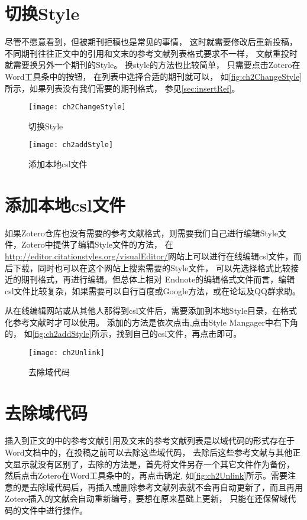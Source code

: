 \documentclass[cn,11pt,chinese]{elegantbook}
\begin{document}
		\section{切换Style}\label{sec:changeStyle}
			尽管不愿意看到，但被期刊拒稿也是常见的事情，
			这时就需要修改后重新投稿，不同期刊往往正文中的引用和文末的参考文献列表格式要求不一样，
			文献重投时就需要换另外一个期刊的Style。
			换style的方法也比较简单，
			只需要点击Zotero在Word工具条中的按钮，
			在列表中选择合适的期刊就可以，
			如\autoref{fig:ch2ChangeStyle}所示，如果列表没有我们需要的期刊格式，
			参见\cref{sec:insertRef}。
				\begin{figure}
					\centering
					\texttt{[image: ch2ChangeStyle]}
					\caption{切换Style}
					\label{fig:ch2ChangeStyle}
				\end{figure}
				\begin{figure}[htbp]
					\centering
					\texttt{[image: ch2addStyle]}
					\caption{添加本地csl文件}
					\label{fig:ch2addStyle}
				\end{figure}
		\section{添加本地csl文件}\label{sec:addStyle}
				如果Zotero仓库也没有需要的参考文献格式，则需要我们自己进行编辑Style文件，Zotero中提供了编辑Style文件的方法，
				在\url{http://editor.citationstyles.org/visualEditor/}网站上可以进行在线编辑csl文件，而后下载，同时也可以在这个网站上搜索需要的Style文件，
				可以先选择格式比较接近的期刊格式，再进行编辑。但总体上相对 Endnote的编辑格式文件而言，编辑csl文件比较复杂，如果需要可以自行百度或Google方法，或在论坛及QQ群求助。
			
				从在线编辑网站或从其他人那得到csl文件后，需要添加到本地Style目录，在格式化参考文献时才可以使用。
				添加的方法是依次点击,点击Style Mangager中右下角的\menu{+}，
				如\autoref{fig:ch2addStyle}所示，找到自己的csl文件，再点击即可。
				\begin{figure}[htbp]
					\centering
					\texttt{[image: ch2Unlink]}
					\caption{去除域代码}
					\label{fig:ch2Unlink}
				\end{figure}
		
		\section{去除域代码}
			插入到正文的中的参考文献引用及文末的参考文献列表是以域代码的形式存在于Word文档中的，在投稿之前可以去除这些域代码，
			去除后这些参考文献与其他正文显示就没有区别了，去除的方法是，首先将文件另存一个其它文件作为备份，
			然后点击Zotero在Word工具条中的，再点击确定,
			如\autoref{fig:ch2Unlink}所示。需要注意的是去除域代码后，再插入或删除参考文献列表就不会再自动更新了，而且再用Zotero插入的文献会自动重新编号，要想在原来基础上更新，
			只能在还保留域代码的文件中进行操作。
			
\end{document}
